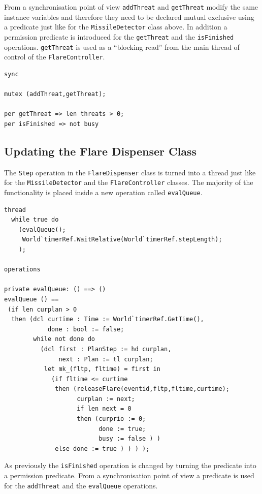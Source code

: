 \documentclass{overturerepchap}
\begin{document}
From a synchronisation point of view \texttt{addThreat} and 
\texttt{getThreat} modify the same instance variables and
therefore they need to be declared mutual exclusive using a
{\bf{}} 
predicate just like for the \texttt{MissileDetector} class above. 
In addition a permission predicate is introduced for the
\texttt{getThreat} and the \texttt{isFinished} operations. 
\texttt{getThreat} is used as a ``blocking read'' from the main
thread of control of the \texttt{FlareController}.

\begin{lstlisting}
sync

mutex (addThreat,getThreat);

per getThreat => len threats > 0;
per isFinished => not busy
\end{lstlisting}

\subsection{Updating the Flare Dispenser Class}

The \texttt{Step} operation in the \texttt{FlareDispenser} class is
turned into a thread just like for the \texttt{MissileDetector} and
the \texttt{FlareController} classes. The majority of the functionality
is placed inside a new operation called \texttt{evalQueue}.

\begin{lstlisting}
thread
  while true do
    (evalQueue();
     World`timerRef.WaitRelative(World`timerRef.stepLength);
    );
     
operations

private evalQueue: () ==> ()
evalQueue () ==
 (if len curplan > 0
  then (dcl curtime : Time := World`timerRef.GetTime(),
            done : bool := false;
        while not done do
          (dcl first : PlanStep := hd curplan,
               next : Plan := tl curplan;
           let mk_(fltp, fltime) = first in
             (if fltime <= curtime
              then (releaseFlare(eventid,fltp,fltime,curtime);
                    curplan := next;
                    if len next = 0
                    then (curprio := 0; 
                          done := true; 
                          busy := false ) )
              else done := true ) ) ) );
\end{lstlisting}

As previously the \texttt{isFinished} operation is changed by turning
the predicate into a permission predicate. From a synchronisation point of
view a {\bf{}} predicate is used for the \texttt{addThreat} and the 
\texttt{evalQueue} operations.
\end{document}
